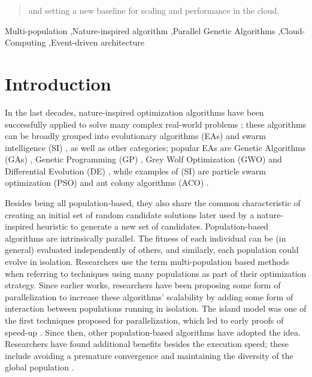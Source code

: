 \documentclass[review]{elsarticle}
\begin{document}
\begin{frontmatter}
\begin{abstract}
and setting a new baseline for scaling and
performance in the cloud.
\end{abstract}

\begin{keyword}
Multi-population \sep Nature-inspired algorithm \sep Parallel Genetic Algorithms \sep Cloud-Computing
\sep Event-driven architecture 
\end{keyword}

\end{frontmatter}

\linenumbers

\section{Introduction}

In the last decades, nature-inspired optimization algorithms have been successfully
applied to solve many complex real-world problems
\cite{yang2014nature}; these algorithms can be broadly grouped into evolutionary algorithms (EAs)
\cite{back1996evolutionary} and swarm intelligence (SI)
\cite{kennedy2006swarm}, as well as other categories; popular EAs
are Genetic Algorithms (GAs) \cite{holland1992adaptation,eiben2003genetic}, 
Genetic Programming (GP) \cite{back1996evolutionary}, Grey Wolf Optimization
(GWO) \cite{mirjalili2014grey} and Differential Evolution (DE) \cite{karabouga2004simple},
while examples of (SI) \cite{kennedy2006swarm} are particle swarm
optimization (PSO) \cite{clerc2010particle} and ant colony algorithms (ACO) \cite{dorigo1999ant}.

Besides being all population-based, they also share the common characteristic of 
creating an initial set of random candidate solutions later used by a 
nature-inspired heuristic to generate a new set of candidates. 
Population-based algorithms are intrinsically parallel.
The fitness of each individual can be (in general) evaluated independently of 
others, and similarly, each population could evolve in isolation. Researchers use the term
multi-population based methods when referring to techniques using
many populations as part of their optimization strategy. 
Since earlier works, researchers have been proposing some form of parallelization
\cite{muhlenbein1988evolution} to increase these algorithms' scalability
by adding some form of interaction between populations running in isolation.
The island model was one of the first techniques proposed for parallelization,
which led to early proofs of speed-up \cite{gorges1990explicit,grosso1985computer}. 
Since then, other population-based algorithms have adopted the idea. 
Researchers have found additional benefits
besides the execution speed; these include avoiding a premature convergence and
maintaining the diversity of the global population \cite{li2015multi}. 
\end{document}
